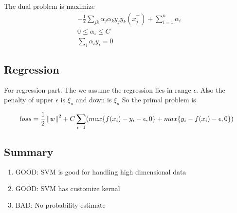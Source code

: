 The dual problem is maximize
\begin{equation}
  \begin{aligned}
    &-\frac{1}{2} \sum_{jk} \alpha_j \alpha_k y_j y_k(x_j^\top) + \sum_{i=1}^n \alpha_i \\
    &0 \leq \alpha_i \leq C \\
    &\sum_i \alpha_i y_i = 0
  \end{aligned}
\end{equation}

\subsection{Regression}
For regression part. The we assume the regression lies in range $\epsilon$. Also the penalty of upper $\epsilon$ is $\xi_u$ and down is $\xi_d$
So the primal problem is

\begin{equation}
  \begin{aligned}
    &loss = \frac{1}{2} \left\lVert w\right\rVert^2 + C\sum_{i=1} (max\{f(x_i) - y_i - \epsilon, 0\}  + max\{y_i - f(x_i) - \epsilon, 0\})\\
  \end{aligned}
\end{equation}

\subsection{Summary}

\begin{enumerate}
  \item {\color{green}GOOD}: SVM is good for handling high dimensional data
  \item {\color{green}GOOD}: SVM has customize kernal
  \item {\color{red}BAD}: No probability estimate
\end{enumerate}
